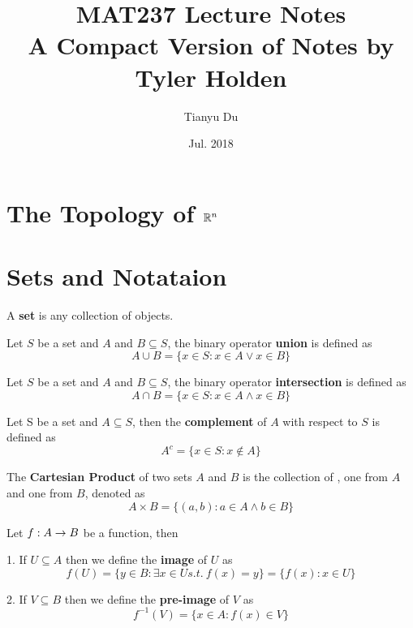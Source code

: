\documentclass{article}
\author{Tianyu Du}
\title{MAT237 Lecture Notes \\ \small A Compact Version of Notes by Tyler Holden}
\date{Jul. 2018}
\begin{document}
	\maketitle
	\tableofcontents
	
	\section{The Topology of $\mathbb{R} ^n$}
	\section{Sets and Notataion}
	
	\begin{definition}
		A \textbf{set} is any collection of  objects.
	\end{definition}
	
	\begin{definition}
		Let $S$ be a set and $A$ and $B \subseteq S$, the binary operator \textbf{union} is defined as
		\[
			A \cup B = \{x \in S: x \in A \lor x \in B \}
		\]
	\end{definition}
	
	\begin{definition}
		Let $S$ be a set and $A$ and $B \subseteq S$, the binary operator \textbf{intersection} is defined as
		\[
			A \cap B = \{x \in S: x \in A \land x \in B \}
		\]
	\end{definition}
	
	\begin{definition}
		Let S be a set and $A \subseteq S$, then the \textbf{complement} of $A$ with respect to $S$ is defined as
		\[
			A^c = \{x \in S: x \notin A\}
		\] 
	\end{definition}
	
	\begin{definition}
		The \textbf{Cartesian Product} of two sets $A$ and $B$ is the collection of , one from $A$ and one from $B$, denoted as 
		\[
			A \times B = \{(a, b): a \in A \land b \in B \}
		\]	
	\end{definition}
	
	\begin{definition}
		Let ${f}: {A} \to {B}$ be a function, then
		
		1. If $U \subseteq A$ then we define the \textbf{image} of $U$ as
			\[
				f(U) = \{y \in B: \exists x \in U s.t.\ f(x) = y \} = \{f(x): x\in U\}
			\] 
		
		2. If $V \subseteq B$ then we define the \textbf{pre-image} of $V$ as 
			\[
				f^{-1}(V) = \{x \in A: f(x) \in V\}
			\]
	\end{definition}
\end{document}
